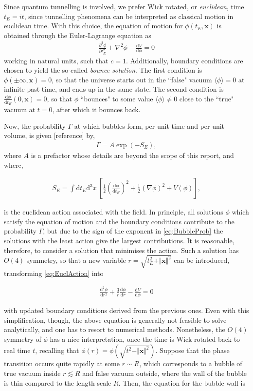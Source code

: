 \documentclass{article}
\renewcommand{\bf}[1]{\mathbf{#1}}
\renewcommand{\dfrac}[2]{\frac{\partial #1}{\partial #2}}
\renewcommand{\d}{\mathrm{d}}
\newcommand{\oo}{\infty}
\numberwithin{equation}{section}
\begin{document}
Since quantum tunnelling is involved, we prefer Wick rotated, or \emph{euclidean}, time $t_E=it$, since tunnelling phenomena can be interpreted as classical motion in euclidean time. With this choice, the equation of motion for $\phi\left (t_E,\bf x\right )$ is obtained through the Euler-Lagrange equation as
\begin{align}\label{eq:EuclEOM}
\dfrac{^2\phi}{t_E^2}+\nabla^2\phi-\frac{\d V}{\d\phi} = 0
\end{align}
working in natural units, such that $c=1$. Additionally, boundary conditions are chosen to yield the so-called \emph{bounce solution}. The first condition is $\phi(\pm\oo,\bf x)=0$, so that the universe starts out in the ``false" vacuum $\langle\phi\rangle=0$ at infinite past time, and ends up in the same state. The second condition is $\frac{\d\phi}{\d t_E}\left (0,\bf x\right )=0$, so that $\phi$ ``bounces" to some value $\langle\phi\rangle\neq0$ close to the ``true" vacuum at $t=0$, after which it bounces back.

Now, the probability $\Gamma$ at which bubbles form, per unit time and per unit volume, is given [reference] by,
\begin{align}\label{eq:BubbleProb}
\Gamma = A\exp\left (-S_E\right ),
\end{align}
where $A$ is a prefactor whose details are beyond the scope of this report, and where,

\begin{align}\label{eq:EuclAction}
S_E = \int \d t_E\d^3x\ \left [\frac{1}{2}\left (\frac{\d\phi}{\d t_E}\right )^2+\frac{1}{2}(\nabla\phi)^2+V(\phi)\right ],
\end{align}

is the euclidean action associated with the field. In principle, all solutions $\phi$ which satisfy the equation of motion and the boundary conditions contribute to the probability $\Gamma$, but due to the sign of the exponent in \eqref{eq:BubbleProb} the solutions with the least action give the largest contributions. It is reasonable, therefore, to consider a solution that minimises the action. Such a solution has $O(4)$ symmetry, so that a new variable $r=\sqrt{t_E^2+\Vert\bf x\Vert^2}$ can be introduced, transforming \eqref{eq:EuclAction} into

\begin{align}
\frac{\d^2\phi}{\d r^2}+\frac{3}{r}\frac{\d\phi}{\d r}-\frac{\d V}{\d\phi} = 0
\end{align}

with updated boundary conditions derived from the previous ones. Even with this simplification, though, the above equation is generally not feasible to solve analytically, and one has to resort to numerical methods. Nonetheless, the $O(4)$ symmetry of $\phi$ has a nice interpretation, once the time is Wick rotated back to real time $t$, recalling that $\phi(r)=\phi\left (\sqrt{t^2-\Vert\bf x\Vert^2}\right )$. Suppose that the phase transition occurs quite rapidly at some $r\sim R$, which corresponds to a bubble of true vacuum inside $r\lesssim R$ and false vacuum outside, where the wall of the bubble is thin compared to the length scale $R$. Then, the equation for the bubble wall is
\end{document}
